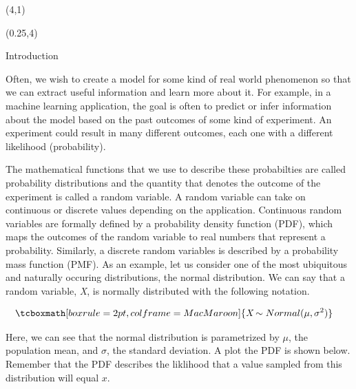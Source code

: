 \documentclass[22pt]{beamer}
\begin{document}
\begin{frame}[fragile]
\begin{textblock}{8}(4,1)
\titlepage
\end{textblock}

\begin{textblock}{5}(0.25,4)


\begin{block}{Introduction}
\justifying

\tiny{Often, we wish to create a model for some kind of real world phenomenon so that we can extract useful information and learn more about it. For example, in a machine learning application, the goal is often to predict or infer information about the model based on the past outcomes of some kind of experiment. An experiment could result in many  different outcomes, each one with a different likelihood (probability).}

\bigskip

\tiny{The mathematical functions that we use to describe these probabilties are called probability distributions and the quantity that denotes the outcome of the experiment is called a random variable. A random variable can take on continuous or discrete values depending on the application. Continuous random variables are formally defined by a probability density function (PDF), which maps the outcomes of the random variable to real numbers that represent a probability. Similarly, a discrete random variables is described by a probability mass function (PMF). As an example, let us consider one of the most ubiquitous and naturally occuring distributions, the normal distribution. We can say that a random variable, \textit{X}, is normally distributed with the following notation. }

\begin{equation*}
\begin{aligned}
& \tcboxmath[boxrule=2pt,colframe=MacMaroon]{\textit{X} \sim Normal(\mu, \sigma^2)}
\end{aligned}
\end{equation*}

\bigskip
\tiny{Here, we can see that the normal distribution is parametrized by $\mu$, the population mean, and $\sigma$, the standard deviation. A plot the PDF is shown below. Remember that the PDF describes the liklihood that a value sampled from this distribution will equal $x$.}


\end{block}
\end{textblock}
\end{frame}
\end{document}
